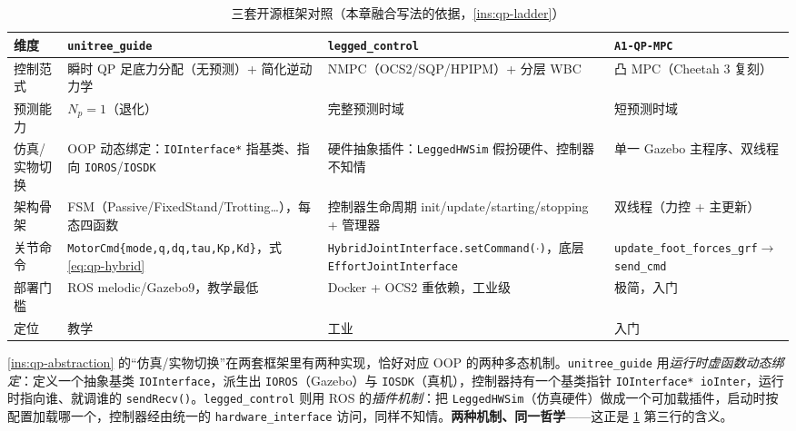 \begin{table}[H]\centering\small
\caption{三套开源框架对照（本章融合写法的依据，\cref{ins:qp-ladder}）}
\begin{tabular}{p{} p{} p{} p{}}
\toprule
维度 & \texttt{unitree\_guide}\cite{unitree2023quadruped} & \texttt{legged\_control}\cite{sleiman2021unified} & \texttt{A1-QP-MPC}\cite{dicarlo2018cheetah} \\
\midrule
控制范式 & 瞬时 QP 足底力分配（无预测）+ 简化逆动力学 & NMPC（OCS2/SQP/HPIPM）+ 分层 WBC & 凸 MPC（Cheetah 3 复刻）\\
预测能力 & $N_p{=}1$（退化）& 完整预测时域 & 短预测时域 \\
仿真/实物切换 & OOP 动态绑定：\texttt{IOInterface*} 指基类、指向 \texttt{IOROS}/\texttt{IOSDK} & 硬件抽象插件：\texttt{LeggedHWSim} 假扮硬件、控制器不知情 & 单一 Gazebo 主程序、双线程 \\
架构骨架 & FSM（Passive/FixedStand/Trotting\dots），每态四函数 & 控制器生命周期 init/update/starting/stopping + 管理器 & 双线程（力控 + 主更新）\\
关节命令 & \texttt{MotorCmd\{mode,q,dq,tau,Kp,Kd\}}，式 \cref{eq:qp-hybrid} & \texttt{HybridJointInterface.setCommand($\cdot$)}，底层 \texttt{EffortJointInterface} & \texttt{update\_foot\_forces\_grf}$\to$\texttt{send\_cmd} \\
部署门槛 & ROS melodic/Gazebo9，教学最低 & Docker + OCS2 重依赖，工业级 & 极简，入门 \\
定位 & 教学 & 工业 & 入门 \\
\bottomrule
\end{tabular}
\label{tab:qp-frameworks}
\end{table}

\begin{insight}\label{ins:qp-two-impl}
\cref{ins:qp-abstraction} 的“仿真/实物切换”在两套框架里有两种实现，恰好对应 OOP 的两种多态机制。\texttt{unitree\_guide} 用\emph{运行时虚函数动态绑定}：定义一个抽象基类 \texttt{IOInterface}，派生出 \texttt{IOROS}（Gazebo）与 \texttt{IOSDK}（真机），控制器持有一个基类指针 \texttt{IOInterface* ioInter}，运行时指向谁、就调谁的 \texttt{sendRecv()}。\texttt{legged\_control} 则用 ROS 的\emph{插件机制}：把 \texttt{LeggedHWSim}（仿真硬件）做成一个可加载插件，启动时按配置加载哪一个，控制器经由统一的 \texttt{hardware\_interface} 访问，同样不知情。\textbf{两种机制、同一哲学}——这正是 \cref{tab:qp-frameworks} 第三行的含义。
\end{insight}

